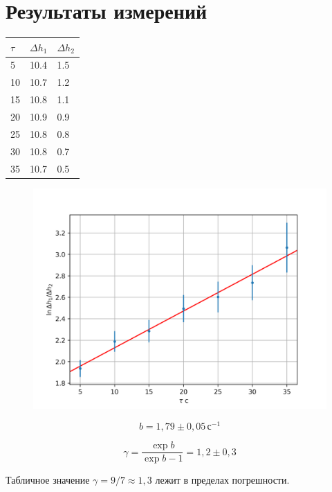 \section{Результаты измерений}
\begin{table}[!ht]
    \centering
    \begin{tabular}{|l|l|l|}
    \hline
        $\tau$ & $\Delta h_1$ & $\Delta h_2$ \\ \hline
        5 & 10.4 & 1.5 \\ \hline
        10 & 10.7 & 1.2 \\ \hline
        15 & 10.8 & 1.1 \\ \hline
        20 & 10.9 & 0.9 \\ \hline
        25 & 10.8 & 0.8 \\ \hline
        30 & 10.8 & 0.7 \\ \hline
        35 & 10.7 & 0.5 \\ \hline
    \end{tabular}
\end{table}

\begin{figure}[ht!]
    \centering\includegraphics[width=0.8\linewidth]{img/plot.png}
\end{figure}

\[b=1{,}79\pm 0{,}05\,\text{с}^{-1}\]

\[\gamma = \frac{\exp b}{\exp b - 1} = 1{,}2 \pm 0{,}3\]

Табличное значение $\gamma = 9/7 \approx 1{,}3$ лежит в пределах погрешности.

\newpage
